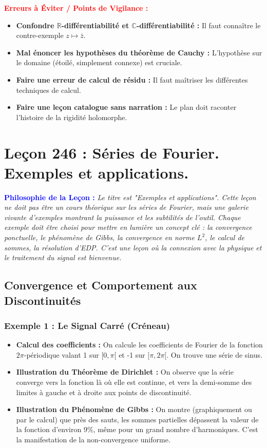 \documentclass[12pt, a4paper, parskip=full]{report}
\theoremstyle{agregstyle}
\newenvironment{philosophie}
  {\par\medskip\noindent\begin{oframed}\noindent\textbf{\textcolor{blue}{Philosophie de la Leçon :}}\itshape}
  {\end{oframed}\par\medskip}
\newenvironment{erreurs}
  {\par\medskip\noindent\begin{oframed}\noindent\textbf{\textcolor{red}{Erreurs à Éviter / Points de Vigilance :}}}
  {\end{oframed}\par\medskip}
\begin{document}
\begin{erreurs}
    \begin{itemize}
        \item \textbf{Confondre $\mathbb{R}$-différentiabilité et $\mathbb{C}$-différentiabilité :} Il faut connaître le contre-exemple $z \mapsto \bar{z}$.
        \item \textbf{Mal énoncer les hypothèses du théorème de Cauchy :} L'hypothèse sur le domaine (étoilé, simplement connexe) est cruciale.
        \item \textbf{Faire une erreur de calcul de résidu :} Il faut maîtriser les différentes techniques de calcul.
        \item \textbf{Faire une leçon catalogue sans narration :} Le plan doit raconter l'histoire de la rigidité holomorphe.
    \end{itemize}
\end{erreurs}
\chapter{Leçon 246 : Séries de Fourier. Exemples et applications.}

\begin{philosophie}
    Le titre est "Exemples et applications". Cette leçon ne doit pas être un cours théorique sur les séries de Fourier, mais une galerie vivante d'exemples montrant la puissance et les subtilités de l'outil. Chaque exemple doit être choisi pour mettre en lumière un concept clé : la convergence ponctuelle, le phénomène de Gibbs, la convergence en norme $L^2$, le calcul de sommes, la résolution d'EDP. C'est une leçon où la connexion avec la physique et le traitement du signal est bienvenue.
\end{philosophie}

\section{Convergence et Comportement aux Discontinuités}
\subsection{Exemple 1 : Le Signal Carré (Créneau)}
\begin{itemize}
    \item \textbf{Calcul des coefficients :} On calcule les coefficients de Fourier de la fonction $2\pi$-périodique valant 1 sur $[0,\pi[$ et -1 sur $[\pi, 2\pi[$. On trouve une série de sinus.
    \item \textbf{Illustration du Théorème de Dirichlet :} On observe que la série converge vers la fonction là où elle est continue, et vers la demi-somme des limites à gauche et à droite aux points de discontinuité.
    \item \textbf{Illustration du Phénomène de Gibbs :} On montre (graphiquement ou par le calcul) que près des sauts, les sommes partielles dépassent la valeur de la fonction d'environ 9\%, même pour un grand nombre d'harmoniques. C'est la manifestation de la non-convergence uniforme.
\end{itemize}
\end{document}
